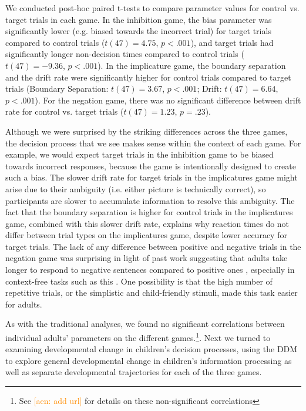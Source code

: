 \documentclass[10pt,letterpaper]{article}
\newcommand{\aen}[1]{\textcolor{DarkOrange}{[aen: #1]}}
\begin{document}
We conducted post-hoc paired t-tests to compare parameter values for control vs. target trials in each game.  In the inhibition game, the bias parameter was significantly lower (e.g. biased towards the incorrect trial) for target trials compared to control trials ($t(47) = 4.75$, $p< .001$), and target trials had significantly longer non-decision times compared to control trials ($t(47) = -9.36$, $p< .001$).  In the implicature game, the boundary separation and the drift rate were significantly higher for control trials compared to target trials (Boundary Separation: $t(47) = 3.67$, $p< .001$; Drift: $t(47) = 6.64$, $p< .001$).  For the negation game, there was no significant difference between drift rate for control vs. target trials ($t(47) = 1.23$, $p = .23$).  

Although we were surprised by the striking differences across the three games, the decision process that we see makes sense within the context of each game.  For example, we would expect target trials in the inhibition game to be biased towards incorrect responses, because the game is intentionally designed to create such a bias.  The slower drift rate for target trials in the implicatures game might arise due to their ambiguity (i.e. either picture is technically correct), so participants are slower to accumulate information to resolve this ambiguity. The fact that the boundary separation is higher for control trials in the implicatures game, combined with this slower drift rate, explains why reaction times do not differ between trial types on the implicatures game, despite lower accuracy for target trials.  The lack of any difference between positive and negative trials in the negation game was surprising in light of past work suggesting that adults take longer to respond to negative sentences compared to positive ones \cite{hclark1972}, especially in context-free tasks such as this \cite{nordmeyer2014a}.  One possibility is that the high number of repetitive trials, or the simplistic and child-friendly stimuli, made this task easier for adults.

As with the traditional analyses, we found no significant correlations between individual adults' parameters on the different games.\footnote{See \aen{add url} for details on these non-significant correlations}. Next we turned to examining developmental change in children's decision processes, using the DDM to explore general developmental change in children's information processing as well as separate developmental trajectories for each of the three games.
\end{document}
